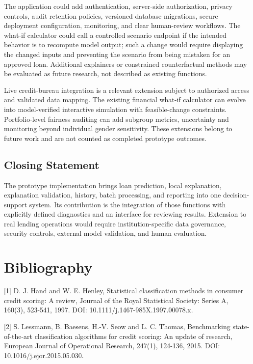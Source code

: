 \documentclass[12pt,a4paper]{report}
\begin{document}
The application could add authentication, server-side authorization, privacy controls, audit retention policies, versioned database migrations, secure deployment configuration, monitoring, and clear human-review workflows. The what-if calculator could call a controlled scenario endpoint if the intended behavior is to recompute model output; such a change would require displaying the changed inputs and preventing the scenario from being mistaken for an approved loan. Additional explainers or constrained counterfactual methods may be evaluated as future research, not described as existing functions.

Live credit-bureau integration is a relevant extension subject to authorized access and validated data mapping. The existing financial what-if calculator can evolve into model-verified interactive simulation with feasible-change constraints. Portfolio-level fairness auditing can add subgroup metrics, uncertainty and monitoring beyond individual gender sensitivity. These extensions belong to future work and are not counted as completed prototype outcomes.

\section{Closing Statement}
The prototype implementation brings loan prediction, local explanation, explanation validation, history, batch processing, and reporting into one decision-support system. Its contribution is the integration of those functions with explicitly defined diagnostics and an interface for reviewing results. Extension to real lending operations would require institution-specific data governance, security controls, external model validation, and human evaluation.

\chapter*{Bibliography}
[1] D. J. Hand and W. E. Henley, Statistical classification methods in consumer credit scoring: A review, Journal of the Royal Statistical Society: Series A, 160(3), 523-541, 1997. DOI: 10.1111/j.1467-985X.1997.00078.x.

[2] S. Lessmann, B. Baesens, H.-V. Seow and L. C. Thomas, Benchmarking state-of-the-art classification algorithms for credit scoring: An update of research, European Journal of Operational Research, 247(1), 124-136, 2015. DOI: 10.1016/j.ejor.2015.05.030.
\end{document}
